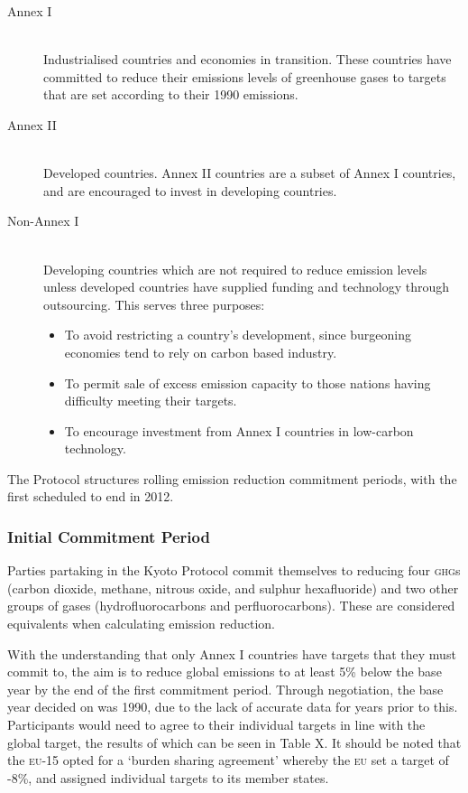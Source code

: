 \begin{description}
	\item[Annex I] \hfill \\
	Industrialised countries and economies in transition. These countries have committed to reduce their emissions levels of greenhouse gases to targets that are set according to their 1990 emissions.
	
	\item[Annex II] \hfill \\
	Developed countries. Annex II countries are a subset of Annex I countries, and are encouraged to invest in developing countries.

	\item[Non-Annex I] \hfill \\
	Developing countries which are not required to reduce emission levels unless developed countries have supplied funding and technology through outsourcing. This serves three purposes:
	\begin{itemize}
		\item To avoid restricting a country's development, since burgeoning economies tend to rely on carbon based industry.
		\item To permit sale of excess emission capacity to those nations having difficulty meeting their targets.
		\item To encourage investment from Annex I countries in low-carbon technology.
	\end{itemize}
\end{description}

The Protocol structures rolling emission reduction commitment periods, with the first scheduled to end in 2012.

\subsubsection{Initial Commitment Period}

Parties partaking in the Kyoto Protocol commit themselves to reducing four \textsc{ghg}s (carbon dioxide, methane, nitrous oxide, and sulphur hexafluoride) and two other groups of gases (hydrofluorocarbons and perfluorocarbons). These are considered \CO equivalents when calculating emission reduction.

With the understanding that only Annex I countries have targets that they must commit to, the aim is to reduce global \CO emissions to at least 5\% below the base year by the end of the first commitment period. Through negotiation, the base year decided on was 1990, due to the lack of accurate data for years prior to this. Participants would need to agree to their individual targets in line with the global target, the results of which can be seen in Table X. It should be noted that the \textsc{eu}-15 opted for a `burden sharing agreement' whereby the \textsc{eu} set a target of -8\%, and assigned individual targets to its member states.


